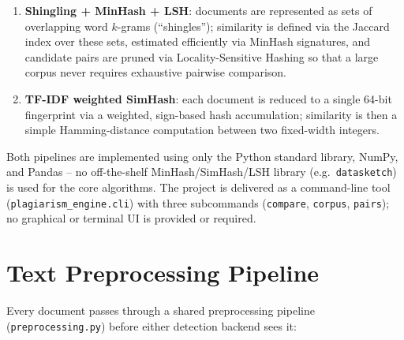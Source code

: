 \documentclass[11pt]{article}
\begin{document}
\begin{enumerate}
    \item \textbf{Shingling + MinHash + LSH}: documents are represented as sets of overlapping word
          $k$-grams (``shingles''); similarity is defined via the Jaccard index over these sets, estimated
          efficiently via MinHash signatures, and candidate pairs are pruned via Locality-Sensitive Hashing
          so that a large corpus never requires exhaustive pairwise comparison.
    \item \textbf{TF-IDF weighted SimHash}: each document is reduced to a single 64-bit fingerprint via a
          weighted, sign-based hash accumulation; similarity is then a simple Hamming-distance computation
          between two fixed-width integers.
    \end{enumerate}

Both pipelines are implemented using only the Python standard library, NumPy, and Pandas -- no
off-the-shelf MinHash/SimHash/LSH library (e.g.\ \verb|datasketch|) is used for the core algorithms. The
project is delivered as a command-line tool (\verb|plagiarism_engine.cli|) with three subcommands
(\verb|compare|, \verb|corpus|, \verb|pairs|); no graphical or terminal UI is provided or required.

\section{Text Preprocessing Pipeline}

Every document passes through a shared preprocessing pipeline (\verb|preprocessing.py|) before either
detection backend sees it:
\end{document}
